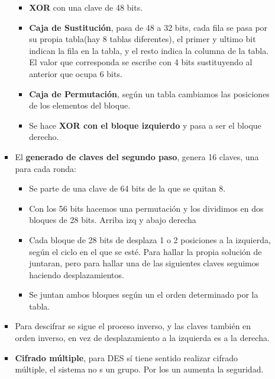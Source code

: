 \documentclass[12pt, twoside, openright]{report} %
\begin{document}
\begin{itemize}
\begin{itemize}
\begin{itemize}
\begin{itemize}
        \item \textbf{XOR} con una clave de 48 bits.
          
        \item \textbf{Caja de Sustitución}, pasa de 48 a 32 bits, cada fila
          se pasa por su propia tabla(hay 8 tablas diferentes), el
          primer y ultimo bit indican la fila en la tabla, y el resto
          indica la columna de la tabla. El valor que corresponda se
          escribe con 4 bits sustituyendo al anterior que ocupa 6 bits.
          
        \item \textbf{Caja de Permutación}, según un tabla cambiamos las
          posiciones de los elementos del bloque.
          
        \item Se hace \textbf{XOR con el bloque izquierdo} y pasa a ser el
          bloque derecho.
          
        \end{itemize}
      \item El \textbf{generado de claves del segundo paso}, genera 16
        claves, una para cada ronda:
        

        \begin{itemize}
        \item Se parte de una clave de 64 bits de la que se quitan 8.
          
        \item Con los 56 bits hacemos una permutación y los dividimos en dos
          bloques de 28 bits. Arriba izq y abajo derecha
          
        \item Cada bloque de 28 bits de desplaza 1 o 2 posiciones a la
          izquierda, según el ciclo en el que se esté. Para hallar la
          propia solución de juntaran, pero para hallar una de las
          siguientes claves seguimos haciendo desplazamientos.
          
        \item Se juntan ambos bloques según un el orden determinado por la
          tabla.
          
        \end{itemize}
      \item Para descifrar se sigue el proceso inverso, y las claves también
        en orden inverso, en vez de desplazamiento a la izquierda es a
        la derecha.
        
      \item \textbf{Cifrado múltiple}, para DES sí tiene sentido realizar
        cifrado múltiple, el sistema no s un grupo. Por los un aumenta
        la seguridad.
        


\end{itemize}
\end{itemize}
\end{itemize}
\end{document}
